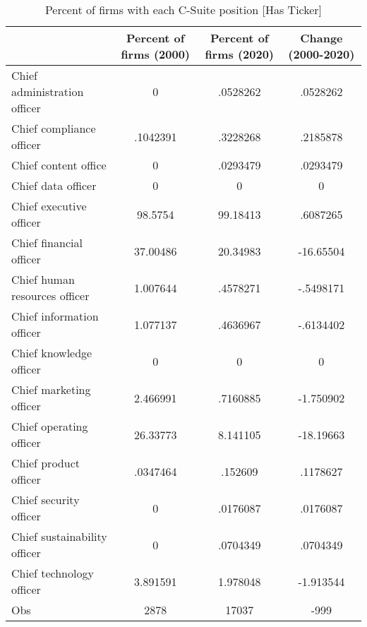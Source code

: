 \begin{table}[htbp]\centering
\caption{Percent of firms with each C-Suite position [Has Ticker]\label{tab98}}
\begin{tabular}{l*{3}{c}}
\toprule
                    &Percent of firms (2000)&Percent of firms (2020)&Change (2000-2020)\\
\midrule
Chief administration officer&           0&    .0528262&    .0528262\\
Chief compliance officer&    .1042391&    .3228268&    .2185878\\
Chief content office&           0&    .0293479&    .0293479\\
Chief data officer  &           0&           0&           0\\
Chief executive officer&     98.5754&    99.18413&    .6087265\\
Chief financial officer&    37.00486&    20.34983&   -16.65504\\
Chief human resources officer&    1.007644&    .4578271&   -.5498171\\
Chief information officer&    1.077137&    .4636967&   -.6134402\\
Chief knowledge officer&           0&           0&           0\\
Chief marketing officer&    2.466991&    .7160885&   -1.750902\\
Chief operating officer&    26.33773&    8.141105&   -18.19663\\
Chief product officer&    .0347464&     .152609&    .1178627\\
Chief security officer&           0&    .0176087&    .0176087\\
Chief sustainability officer&           0&    .0704349&    .0704349\\
Chief technology officer&    3.891591&    1.978048&   -1.913544\\
Obs                 &        2878&       17037&        -999\\
\bottomrule
\end{tabular}
\end{table}

